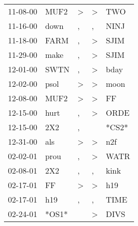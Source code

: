 \begin{supertabular}{p{0.07\textwidth}p{0.06\textwidth}p{0.02\textwidth}p{0.02\textwidth}p{0.06\textwidth}}
          11-08-00\textsuperscript{} &           MUF2\textsuperscript{} &  \textgreater &     \textgreater &            TWO\textsuperscript{} \\
          11-16-00\textsuperscript{} &           down\textsuperscript{} &             , &                , &           NINJ\textsuperscript{} \\
          11-18-00\textsuperscript{} &           FARM\textsuperscript{} &             , &     \textgreater &           SJIM\textsuperscript{} \\
          11-29-00\textsuperscript{} &           make\textsuperscript{} &             , &     \textgreater &           SJIM\textsuperscript{} \\
          12-01-00\textsuperscript{} &           SWTN\textsuperscript{} &             , &     \textgreater &           bday\textsuperscript{} \\
          12-02-00\textsuperscript{} &           psol\textsuperscript{} &  \textgreater &     \textgreater &           moon\textsuperscript{} \\
          12-08-00\textsuperscript{} &           MUF2\textsuperscript{} &  \textgreater &     \textgreater &             FF\textsuperscript{} \\
          12-15-00\textsuperscript{} &           hurt\textsuperscript{} &             , &     \textgreater &           ORDE\textsuperscript{} \\
          12-15-00\textsuperscript{} &            2X2\textsuperscript{} &             , &                  &                            *CS2* \\
          12-31-00\textsuperscript{} &            als\textsuperscript{} &  \textgreater &     \textgreater &            n2f\textsuperscript{} \\
          02-02-01\textsuperscript{} &           prou\textsuperscript{} &             , &     \textgreater &           WATR\textsuperscript{} \\
          02-08-01\textsuperscript{} &            2X2\textsuperscript{} &             , &                , &           kink\textsuperscript{} \\
          02-17-01\textsuperscript{} &             FF\textsuperscript{} &  \textgreater &     \textgreater &            h19\textsuperscript{} \\
          02-17-01\textsuperscript{} &            h19\textsuperscript{} &             , &                , &           TIME\textsuperscript{} \\
          02-24-01\textsuperscript{} &                            *OS1* &               &     \textgreater &           DIVS\textsuperscript{} \\

\end{supertabular}
